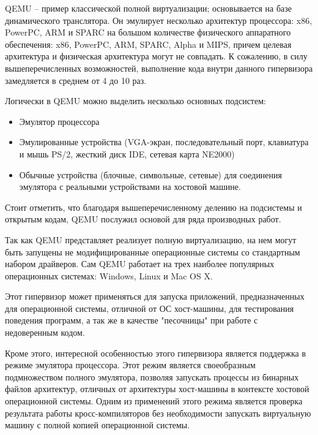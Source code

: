 QEMU -- пример классической полной виртуализации; основывается на базе динамического
транслятора. Он эмулирует несколько архитектур процессора: x86, PowerPC, ARM и SPARC на
большом количестве физического аппаратного обеспечения: x86, PowerPC, ARM, SPARC, Alpha
и MIPS, причем целевая архитектура и физическая архитектура могут не совпадать. К сожалению,
в силу вышеперечисленных возможностей, выполнение кода внутри данного гипервизора
замедляется в среднем от 4 до 10 раз.\cite{Bellard:2005:QFP:1247360.1247401}

Логически в QEMU можно выделить несколько основных подсистем:
\begin{itemize}
    \item Эмулятор процессора
    \item Эмулированные устройства (VGA-экран, последовательный порт, клавиатура и мышь PS/2,
     жесткий диск IDE, сетевая карта NE2000)
    \item Обычные устройства (блочные, символьные, сетевые) для соединения эмулятора с 
    реальными устройствами на хостовой машине.
\end{itemize}
Стоит отметить, что благодаря вышеперечисленному делению на подсистемы и открытым кодам,
QEMU послужил основой для ряда производных работ.
\cite{Raghav:2012:FSS:2159430.2159442} 
\cite{Becker:2012:XEQ:2380356.2380368} 
\cite{Hong:2012:HMR:2259016.2259030}
\cite{Ding:2011:PPS:2117686.2118470}
\cite{Nakamoto:2009:PUE:1524877.1525243}

Так как QEMU представляет реализует полную виртуализацию, на нем могут быть запущены
не модифицированные операционные системы со стандартным набором драйверов.
Сам QEMU работает на трех наиболее популярных операционных системах: Windows, 
Linux и Mac OS X.

Этот гипервизор может применяться для запуска приложений, предназначенных для 
операционной системы, отличной от ОС хост-машины, для тестирования поведения
программ, а так же в качестве "песочницы" при работе с недоверенным кодом.

Кроме этого, интересной особенностью этого гипервизора является поддержка в 
режиме эмулятора процессора. Этот режим является своеобразным подмножеством полного
эмулятора, позволяя запускать процессы из бинарных файлов архитектур, отличных от 
архитектуры хост-машины в контексте хостовой операционной системы. Одним из применений 
этого режима является проверка результата работы кросс-компиляторов без необходимости
запускать виртуальную машину с полной копией операционной системы.

